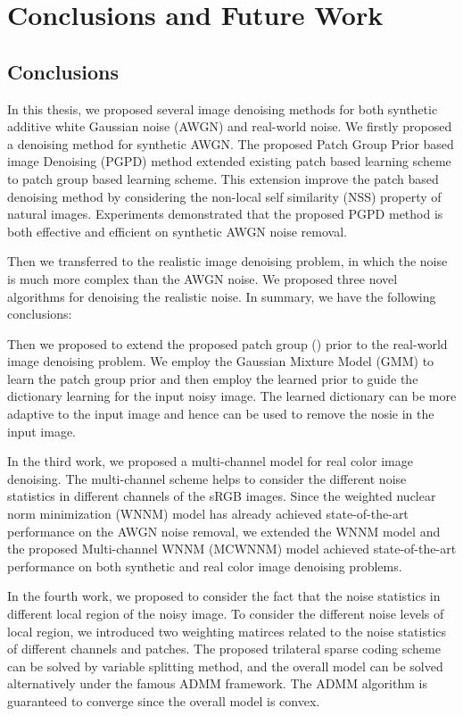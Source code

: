 %
\chapter{Conclusions and Future Work}
\label{sec:conclusions}


\section{Conclusions}
\label{sec:conclusions:sec1}
In this thesis, we proposed several image denoising methods for both synthetic additive white Gaussian noise (AWGN) and real-world noise. We firstly proposed a denoising method for synthetic AWGN. The proposed Patch Group Prior based image Denoising (PGPD) method extended existing patch based learning scheme \cite{epll} to patch group based learning scheme. This extension improve the patch based denoising method by considering the non-local self similarity (NSS) property of natural images. Experiments demonstrated that the proposed PGPD method is both effective and efficient on synthetic AWGN noise removal.


Then we transferred to the realistic image denoising problem, in which the noise is much more complex than the AWGN noise. We proposed three novel algorithms for denoising the realistic noise. In summary, we have the following conclusions:


Then we proposed to extend the proposed patch group () prior to the real-world image denoising problem. We employ the Gaussian Mixture Model (GMM) to learn the patch group prior and then employ the learned prior to guide the dictionary learning for the input noisy image. The learned dictionary can be more adaptive to the input image and hence can be used to remove the nosie in the input image.

In the third work, we proposed a multi-channel model for real color image denoising. The multi-channel scheme helps to consider the different noise statistics in different channels of the sRGB images. Since the weighted nuclear norm minimization (WNNM) model has already achieved state-of-the-art performance on the AWGN noise removal, we extended the WNNM model and the proposed Multi-channel WNNM (MCWNNM) model achieved state-of-the-art performance on both synthetic and real color image denoising problems. 

In the fourth work, we proposed to consider the fact that the noise statistics in different local region of the noisy image. To consider the different noise levels of local region, we introduced two weighting matirces related to the noise statistics of different channels and patches. The proposed trilateral sparse coding scheme can be solved by variable splitting method, and the overall model can be solved alternatively under the famous ADMM framework. The ADMM algorithm is guaranteed to converge since the overall model is convex.

